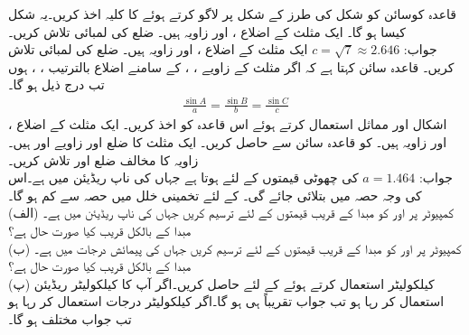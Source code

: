 قاعدہ کوسائن کو شکل  کی طرز کے شکل پر لاگو کرتے ہوئے  کا کلیہ اخذ کریں۔یہ شکل کیسا ہو گا۔ 
\quad
ایک مثلث کے اضلاع ،  اور زاویہ  ہیں۔  ضلع  کی لمبائی تلاش کریں۔ \\
جواب:\quad
$c=\sqrt{7}\approx 2.646$
\quad
ایک مثلث کے اضلاع ،  اور زاویہ  ہیں۔  ضلع  کی لمبائی تلاش کریں۔ 
\quad
قاعدہ سائن کہتا ہے کہ اگر مثلث کے زاویے ، ،  کے سامنے اضلاع بالترتیب ، ،  ہوں تب درج ذیل ہو گا۔
\begin{align*}
\tfrac{\sin A}{a}=\tfrac{\sin B}{b}=\tfrac{\sin C}{c}
\end{align*} 
اشکال  اور مماثل  استعمال کرتے ہوئے اس قاعدہ کو اخذ کریں۔
 \quad
ایک مثلث کے اضلاع ،  اور زاویہ  ہیں۔   کو قاعدہ سائن سے حاصل کریں۔
\quad
ایک مثلث کا ضلع  اور زاویے   اور  ہیں۔زاویہ  کا مخالف ضلع  اور  تلاش کریں۔\\
جواب:\quad
$a=1.464$
   
\quad
{} کی چھوٹی قیمتوں کے لئے  ہوتا ہے جہاں  کی ناپ ریڈیئن میں ہے۔اس کی وجہ حصہ  میں بتلائی جائے گی۔  کے لئے تخمینی خلل  میں  حصہ سے کم ہو گا۔\\
(الف)\quad
کمپیوٹر پر  اور  کو مبدا کے قریب قیمتوں کے لئے ترسیم کریں جہاں  کی ناپ ریڈیئن میں ہے۔مبدا کے بالکل قریب کیا صورت حال ہے؟\\
(ب)\quad
کمپیوٹر پر  اور  کو مبدا کے قریب قیمتوں کے لئے ترسیم کریں جہاں  کی پیمائش درجات میں ہے۔مبدا کے بالکل قریب کیا صورت حال ہے؟\\
(پ)\quad
کیلکولیٹر استعمال کرتے ہوئے  کے لئے  حاصل کریں۔اگر آپ کا کیلکولیٹر ریڈیئن استعمال کر رہا ہو تب جواب تقریباً  ہی ہو گا۔اگر کیلکولیٹر درجات استعمال کر رہا ہو تب جواب مختلف ہو گا۔

